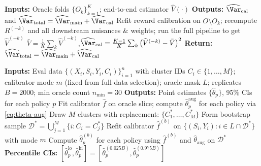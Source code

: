 \begin{algorithm}[t]
\caption{\textsc{Cal-Aware-Jackknife}: calibration-uncertainty-aware variance addition}
\label{alg:oua}
\begin{algorithmic}[1]
\STATE \textbf{Inputs:} Oracle folds $\{O_k\}_{k=1}^K$; end-to-end estimator $\widehat V(\cdot)$
\STATE \textbf{Outputs:} $\widehat{\Var}_{\mathrm{cal}}$ and $\widehat{\Var}_{\mathrm{total}}=\widehat{\Var}_{\mathrm{main}}+\widehat{\Var}_{\mathrm{cal}}$
  \STATE Refit reward calibration on $O\setminus O_k$; recompute $R^{(-k)}$ and all downstream nuisances \& weights; run the full pipeline to get $\widehat V^{(-k)}$
\ENDFOR
\STATE $\displaystyle \bar V=\tfrac{1}{K}\sum_k \widehat V^{(-k)}$,\quad $\widehat{\Var}_{\mathrm{cal}}=\frac{K-1}{K}\sum_k\big(\widehat V^{(-k)}-\bar V\big)^2$
\STATE \textbf{Return:} $\widehat{\Var}_{\mathrm{total}}=\widehat{\Var}_{\mathrm{main}}+\widehat{\Var}_{\mathrm{cal}}$
\end{algorithmic}
\end{algorithm}

\begin{algorithm}[t]
\caption{\textsc{Bootstrap-Direct}: cluster bootstrap with calibrator refit for Direct mode}
\label{alg:bootstrap-direct}
\begin{algorithmic}[1]
\STATE \textbf{Inputs:} Eval data $\{(X_i, S_i, Y_i, C_i)\}_{i=1}^n$ with cluster IDs $C_i \in \{1,\ldots,M\}$; calibrator mode $m$ (fixed from full-data selection); oracle mask $L$; replicates $B{=}2000$; min oracle count $n_{\min}{=}30$
\STATE \textbf{Outputs:} Point estimates $\{\hat\theta_p\}$, 95\% CIs for each policy $p$
\STATE Fit calibrator $\hat f$ on oracle slice; compute $\hat\theta_p^{\mathrm{aug}}$ for each policy via \cref{eq:theta-aug}
  \REPEAT
    \STATE Draw $M$ clusters with replacement: $\{C_1^*, \ldots, C_M^*\}$
    \STATE Form bootstrap sample $\mathcal{D}^* = \bigcup_{j=1}^M \{i : C_i = C_j^*\}$
   
  \STATE Refit calibrator $\hat f^{(b)}$ on $\{(S_i, Y_i) : i \in L \cap \mathcal{D}^*\}$ with mode $m$
  \STATE Compute $\hat\theta_p^{(b)}$ for each policy using $\hat f^{(b)}$ and $\hat\theta_{\mathrm{aug}}$ on $\mathcal{D}^*$
\ENDFOR
\STATE \textbf{Percentile CIs:} $[\hat\theta_p^{\mathrm{lo}}, \hat\theta_p^{\mathrm{hi}}] = [\hat\theta_p^{(0.025B)}, \hat\theta_p^{(0.975B)}]$
\end{algorithmic}
\end{algorithm}

